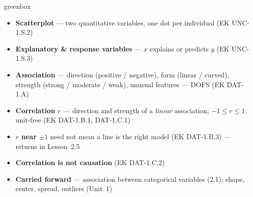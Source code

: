 \documentclass[10pt]{article}
\begin{document}
\boxguard
\begin{skillbox}{greenbox}
\begin{minipage}[t]{0.48\linewidth}
    \begin{itemize}
        \item \textbf{Scatterplot} --- two quantitative variables, one dot per individual
              (EK UNC-1.S.2)
        \item \textbf{Explanatory \& response variables} --- $x$ explains or predicts $y$
              (EK UNC-1.S.3)
        \item \textbf{Association} --- direction (positive / negative), form (linear /
              curved), strength (strong / moderate / weak), unusual features --- DOFS
              (EK DAT-1.A)
    \end{itemize}
\end{minipage}
\hfill
\begin{minipage}[t]{0.48\linewidth}
    \begin{itemize}
        \item \textbf{Correlation $r$} --- direction and strength of a \emph{linear}
              association; $-1 \le r \le 1$; unit-free (EK DAT-1.B.1, DAT-1.C.1)
        \item \textbf{$r$ near $\pm1$} need not mean a line is the right model
              (EK DAT-1.B.3) --- returns in Lesson~2.5
        \item \textbf{Correlation is not causation} (EK DAT-1.C.2)
        \item \textbf{Carried forward} --- association between categorical variables (2.1);
              shape, center, spread, outliers (Unit~1)
    \end{itemize}
\end{minipage}
\end{skillbox}
\end{document}
